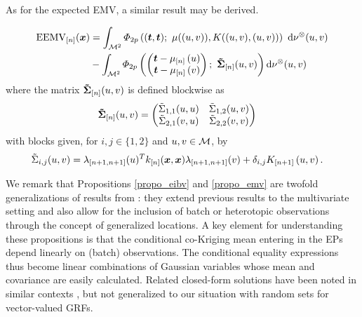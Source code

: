 \documentclass[aoas]{imsart}
\begin{document}
As for the expected EMV, a similar result may be derived.
\begin{propo}
\label{propo_emv}

\begin{equation*}
\begin{split}
\currentEEMV(\bm{x})
&=\int_{\domain^2} 
\varPhi_{2\no}
\left(
(\bt, \bt); ~ \mu((u,v)), 
K((u,v),(u,v))
\right) 
\
\mathrm{d}\mes^{\otimes} 
(u,v)\\
&-\int_{\domain^2} \varPhi_{2\no}
\left(
\left(
\begin{matrix}
\bt-\currentMean{\uu}\\
\bt-\currentMean{\vv}
\end{matrix}
\right);~
\mathbf{\tilde{\Sigma}}_{[\stage]}(\uu, \vv)
\right)
\mathrm{d}\mes^{\otimes} 
(u,v)
\end{split}
\end{equation*}
where the matrix $\mathbf{\tilde{\Sigma}}_{[n]}(u, v)$ is defined blockwise as
\begin{equation*}
\begin{split}
\mathbf{\tilde{\Sigma}}_{[n]}(\uu, \vv)&=
\left(
\begin{matrix}
\tilde{\Sigma}_{1,1}(\uu, \uu) & \tilde{\Sigma}_{1,2}(\uu, \vv)\\
\tilde{\Sigma}_{2,1}(\vv, \uu) & \tilde{\Sigma}_{2,2}(\vv, \vv)
\end{matrix}\right)
\end{split}
\end{equation*}
with blocks given, for $i,j\in \{1,2\}$ and $u,v\in \mathcal{M}$, by
\begin{equation*}
\begin{split}
\tilde{\Sigma}_{i,j}(u, v) &= \lambda_{[n+1,n+1]}(\uu)^T k_{[n]}(\bm{x},\bm{x}) \lambda_{[n+1,n+1]}(\vv) + \delta_{i,j}\futureCov{\uu, \vv}.
\end{split}
\end{equation*}
\end{propo}

We remark that Propositions \ref{propo_eibv} and \ref{propo_emv} are
twofold generalizations of results from \cite{chevalier2014fast}: they
extend previous results to the multivariate setting and also allow for
the inclusion of batch or heterotopic observations through the concept
of generalized locations.  A key element for understanding these
propositions is that the conditional co-Kriging mean entering in the
EPs depend linearly on (batch) observations. The conditional equality
expressions thus become linear combinations of Gaussian variables
whose mean and covariance are easily calculated.  Related closed-form
solutions have been noted in similar contexts
\citep{bhattacharjya2013value,stroh}, but not generalized to our
situation with random sets for vector-valued GRFs.
\end{document}
